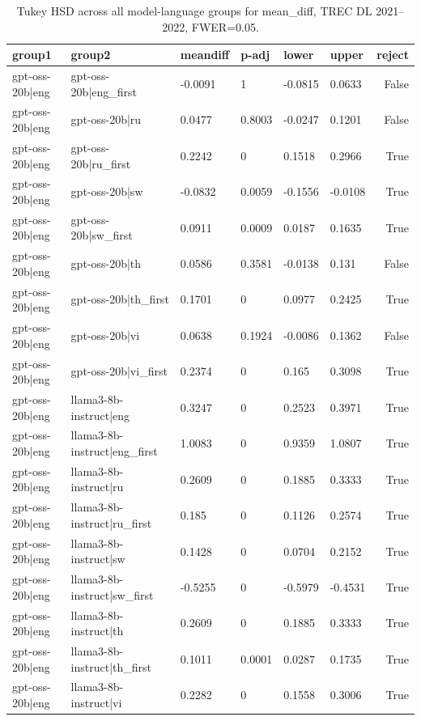\begin{table}
\caption{Tukey HSD across all model-language groups for mean_diff, TREC DL 2021--2022, FWER=0.05.}
\label{tab:tukey_all_models_all_langs_2021_2022_mean_diff}
\begin{tabular}{llllllr}
\toprule
group1 & group2 & meandiff & p-adj & lower & upper & reject \\
\midrule
gpt-oss-20b|eng & gpt-oss-20b|eng_first & -0.0091 & 1 & -0.0815 & 0.0633 & False \\
gpt-oss-20b|eng & gpt-oss-20b|ru & 0.0477 & 0.8003 & -0.0247 & 0.1201 & False \\
gpt-oss-20b|eng & gpt-oss-20b|ru_first & 0.2242 & 0 & 0.1518 & 0.2966 & True \\
gpt-oss-20b|eng & gpt-oss-20b|sw & -0.0832 & 0.0059 & -0.1556 & -0.0108 & True \\
gpt-oss-20b|eng & gpt-oss-20b|sw_first & 0.0911 & 0.0009 & 0.0187 & 0.1635 & True \\
gpt-oss-20b|eng & gpt-oss-20b|th & 0.0586 & 0.3581 & -0.0138 & 0.131 & False \\
gpt-oss-20b|eng & gpt-oss-20b|th_first & 0.1701 & 0 & 0.0977 & 0.2425 & True \\
gpt-oss-20b|eng & gpt-oss-20b|vi & 0.0638 & 0.1924 & -0.0086 & 0.1362 & False \\
gpt-oss-20b|eng & gpt-oss-20b|vi_first & 0.2374 & 0 & 0.165 & 0.3098 & True \\
gpt-oss-20b|eng & llama3-8b-instruct|eng & 0.3247 & 0 & 0.2523 & 0.3971 & True \\
gpt-oss-20b|eng & llama3-8b-instruct|eng_first & 1.0083 & 0 & 0.9359 & 1.0807 & True \\
gpt-oss-20b|eng & llama3-8b-instruct|ru & 0.2609 & 0 & 0.1885 & 0.3333 & True \\
gpt-oss-20b|eng & llama3-8b-instruct|ru_first & 0.185 & 0 & 0.1126 & 0.2574 & True \\
gpt-oss-20b|eng & llama3-8b-instruct|sw & 0.1428 & 0 & 0.0704 & 0.2152 & True \\
gpt-oss-20b|eng & llama3-8b-instruct|sw_first & -0.5255 & 0 & -0.5979 & -0.4531 & True \\
gpt-oss-20b|eng & llama3-8b-instruct|th & 0.2609 & 0 & 0.1885 & 0.3333 & True \\
gpt-oss-20b|eng & llama3-8b-instruct|th_first & 0.1011 & 0.0001 & 0.0287 & 0.1735 & True \\
gpt-oss-20b|eng & llama3-8b-instruct|vi & 0.2282 & 0 & 0.1558 & 0.3006 & True \\

\end{tabular}
\end{table}
